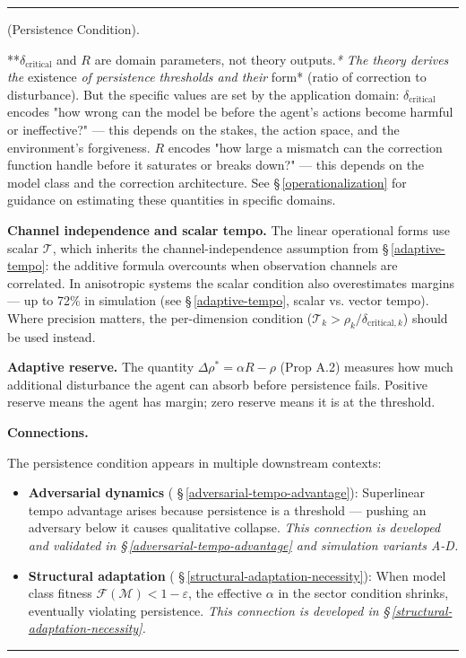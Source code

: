 \documentclass[11pt,oneside]{article}
\newcounter{claim}[section]
\renewcommand{\theclaim}{\thesection.\arabic{claim}}
\newenvironment{segment}[2]{%
  \refstepcounter{claim}%
  \bigskip\noindent\hrule\smallskip
  \noindent{\bfseries #1~\theclaim}\enskip(#2).\par\smallskip
  \noindent\ignorespaces
}{%
  \par\smallskip\noindent\hrule\bigskip
}
\newenvironment{theorem}[1][]{\begin{segment}{Theorem}{#1}}{\end{segment}}
\begin{document}
\begin{theorem}[Persistence Condition]
**$\delta_{\text{critical}}$ and $R$ are domain parameters, not theory outputs.\textit{* The theory derives the }existence\textit{ of persistence thresholds and their }form* (ratio of correction to disturbance). But the specific values are set by the application domain: $\delta_{\text{critical}}$ encodes "how wrong can the model be before the agent's actions become harmful or ineffective?" — this depends on the stakes, the action space, and the environment's forgiveness. $R$ encodes "how large a mismatch can the correction function handle before it saturates or breaks down?" — this depends on the model class and the correction architecture. See \S\,\ref{operationalization} for guidance on estimating these quantities in specific domains.

\textbf{Channel independence and scalar tempo.} The linear operational forms use scalar $\mathcal{T}$, which inherits the channel-independence assumption from \S\,\ref{adaptive-tempo}: the additive formula overcounts when observation channels are correlated. In anisotropic systems the scalar condition also overestimates margins — up to 72\% in simulation (see \S\,\ref{adaptive-tempo}, scalar vs. vector tempo). Where precision matters, the per-dimension condition ($\mathcal{T}_k > \rho_k / \delta_{\text{critical},k}$) should be used instead.

\textbf{Adaptive reserve.} The quantity $\Delta\rho^* = \alpha R - \rho$ (Prop A.2) measures how much additional disturbance the agent can absorb before persistence fails. Positive reserve means the agent has margin; zero reserve means it is at the threshold.


\medskip\noindent\textbf{Connections.}


The persistence condition appears in multiple downstream contexts:

\begin{itemize}
  \item \textbf{Adversarial dynamics} ( \S\,\ref{adversarial-tempo-advantage}): Superlinear tempo advantage arises because persistence is a threshold — pushing an adversary below it causes qualitative collapse. \textit{This connection is developed and validated in \S\,\ref{adversarial-tempo-advantage} and simulation variants A-D.}
\end{itemize}


\begin{itemize}
  \item \textbf{Structural adaptation} ( \S\,\ref{structural-adaptation-necessity}): When model class fitness $\mathcal{F}(\mathcal{M}) < 1 - \varepsilon$, the effective $\alpha$ in the sector condition shrinks, eventually violating persistence. \textit{This connection is developed in \S\,\ref{structural-adaptation-necessity}.}
\end{itemize}



\end{theorem}
\end{document}
